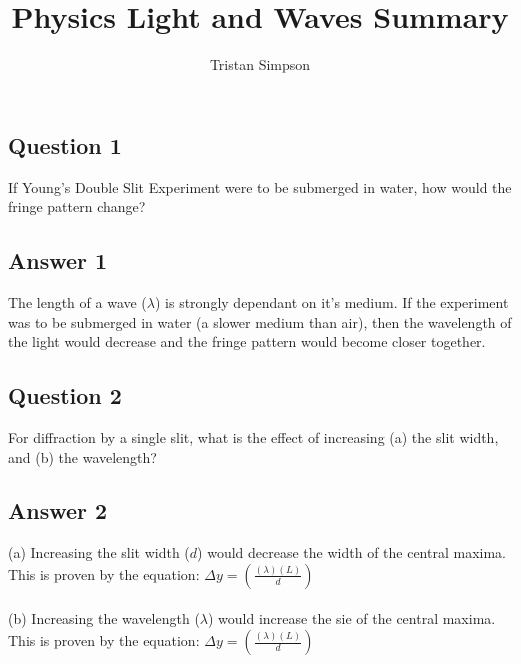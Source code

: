\documentclass{article}
\title{Physics Light and Waves Summary}
\author{Tristan Simpson}
\begin{document}
\maketitle





\subsection*{Question 1}
If Young's Double Slit Experiment were to be submerged in water, how would the fringe pattern change?
\subsection*{Answer 1}
The length of a wave ($\lambda$) is strongly dependant on it's medium. If the experiment was to be submerged in water (a slower medium than air), then the wavelength of the light would decrease and the fringe pattern would become closer together.\\

\subsection*{Question 2}
For diffraction by a single slit, what is the effect of increasing (a) the slit width, and (b) the wavelength?
\subsection*{Answer 2}
(a) Increasing the slit width ($d$) would decrease the width of the central maxima. This is proven by the equation: $\Delta y = \left(\frac{(\lambda)(L)}{d}\right)$\\\\
(b) Increasing the wavelength ($\lambda$) would increase the sie of the central maxima. This is proven by the equation: $\Delta y = \left(\frac{(\lambda)(L)}{d}\right)$\\


\end{document}
